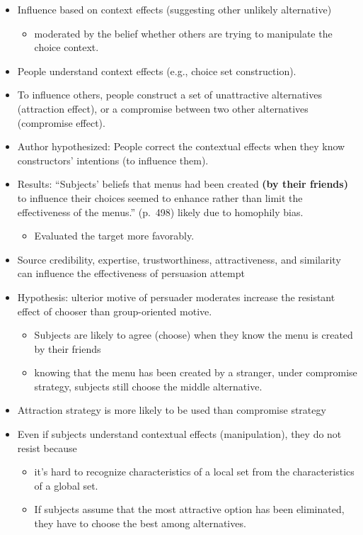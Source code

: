 \documentclass[
]{book}
\providecommand{\tightlist}{%
  \setlength{\itemsep}{0pt}\setlength{\parskip}{0pt}}
\begin{document}
\citep{hamilton2003}

\begin{itemize}
\item
  Influence based on context effects (suggesting other unlikely alternative)

  \begin{itemize}
  \tightlist
  \item
    moderated by the belief whether others are trying to manipulate the choice context.
  \end{itemize}
\item
  People understand context effects (e.g., choice set construction).
\item
  To influence others, people construct a set of unattractive alternatives (attraction effect), or a compromise between two other alternatives (compromise effect).
\item
  Author hypothesized: People correct the contextual effects when they know constructors' intentions (to influence them).
\item
  Results: ``Subjects' beliefs that menus had been created \textbf{(by their friends)} to influence their choices seemed to enhance rather than limit the effectiveness of the menus.'' (p.~498) likely due to homophily bias.

  \begin{itemize}
  \tightlist
  \item
    Evaluated the target more favorably.
  \end{itemize}
\item
  Source credibility, expertise, trustworthiness, attractiveness, and similarity can influence the effectiveness of persuasion attempt \citep{wilson1993}
\item
  Hypothesis: ulterior motive of persuader moderates increase the resistant effect of chooser than group-oriented motive.

  \begin{itemize}
  \item
    Subjects are likely to agree (choose) when they know the menu is created by their friends
  \item
    knowing that the menu has been created by a stranger, under compromise strategy, subjects still choose the middle alternative.
  \end{itemize}
\item
  Attraction strategy is more likely to be used than compromise strategy
\item
  Even if subjects understand contextual effects (manipulation), they do not resist because

  \begin{itemize}
  \item
    it's hard to recognize characteristics of a local set from the characteristics of a global set. \citep{simonson1993}
  \item
    If subjects assume that the most attractive option has been eliminated, they have to choose the best among alternatives.
  \end{itemize}
\end{itemize}
\end{document}
